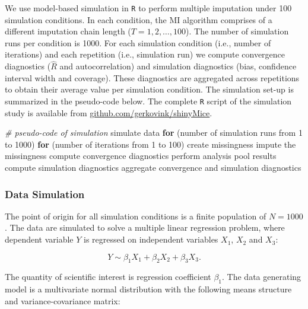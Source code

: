 \documentclass[
  Royal, times, sageapa]{sagej}
\newenvironment{Shaded}{\begin{snugshade}}{\end{snugshade}}
\newcommand{\CommentTok}[1]{\textcolor[rgb]{0.56,0.35,0.01}{\textit{#1}}}
\newcommand{\ControlFlowTok}[1]{\textcolor[rgb]{0.13,0.29,0.53}{\textbf{#1}}}
\newcommand{\DecValTok}[1]{\textcolor[rgb]{0.00,0.00,0.81}{#1}}
\newcommand{\NormalTok}[1]{#1}
\begin{document}
We use model-based simulation in \texttt{R} to perform multiple
imputation under 100 simulation conditions. In each condition, the MI
algorithm comprises of a different imputation chain length
(\(T = 1, 2, \dots, 100\)). The number of simulation runs per condition
is 1000. For each simulation condition (i.e., number of iterations) and
each repetition (i.e., simulation run) we compute convergence
diagnostics (\(\widehat{R}\) and autocorrelation) and simulation
diagnostics (bias, confidence interval width and coverage). These
diagnostics are aggregated across repetitions to obtain their average
value per simulation condition. The simulation set-up is summarized in
the pseudo-code below. The complete \texttt{R} script of the simulation
study is available from
\href{https://github.com/gerkovink/shinyMice/tree/master/3.Thesis/1.SimulationStudy}{github.com/gerkovink/shinyMice}.

\begin{Shaded}
\begin{Highlighting}[]
\CommentTok{# pseudo-code of simulation }
\NormalTok{simulate data }
\ControlFlowTok{for}\NormalTok{ (number of simulation runs from }\DecValTok{1}\NormalTok{ to }\DecValTok{1000}\NormalTok{)}
  \ControlFlowTok{for}\NormalTok{ (number of iterations from }\DecValTok{1}\NormalTok{ to }\DecValTok{100}\NormalTok{)}
\NormalTok{    create missingness}
\NormalTok{    impute the missingness}
\NormalTok{    compute convergence diagnostics}
\NormalTok{    perform analysis}
\NormalTok{    pool results}
\NormalTok{    compute simulation diagnostics}
\NormalTok{aggregate convergence and simulation diagnostics}
\end{Highlighting}
\end{Shaded}

\hypertarget{data-simulation}{%
\subsubsection{Data Simulation}\label{data-simulation}}

The point of origin for all simulation conditions is a finite population
of \(N=1000\). The data are simulated to solve a multiple linear
regression problem, where dependent variable \(Y\) is regressed on
independent variables \(X_1\), \(X_2\) and \(X_3\):

\[Y \sim \beta_1 X_1 + \beta_2 X_2 + \beta_3 X_3.\]

The quantity of scientific interest is regression coefficient
\(\beta_1\). The data generating model is a multivariate normal
distribution with the following means structure and variance-covariance
matrix:
\end{document}
